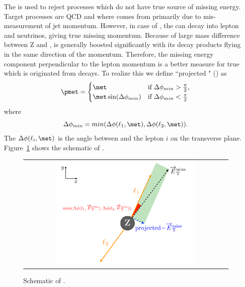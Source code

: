 The \met{} is used to reject processes which do not have true source of missing energy. 
Target processes are QCD and \dyll{} where \met{} comes from primarily due to 
mis-measurement of jet momentum. However, in case of \dytt{}, the \Tau{} can 
decay into lepton and neutrinos, giving true missing momentum. Because of large 
mass difference between Z and \Tau{}, \Tau{} is generally boosted significantly 
with its decay products flying in the same direction of the \Tau momentum. 
Therefore, the missing energy component perpendicular to the lepton momentum 
is a better measure for true \met{} which is originated from \Tau{} decays. 
To realize this we define ``projected \met " (\pmet) as 
\begin{equation}
\pmet 
= 
\begin{cases} \met & \text{if $\Delta\phi_{min}>\frac{\pi}{2}$,}
\\
\met\sin(\Delta\phi_{min}) & \text{if $\Delta\phi_{min}<\frac{\pi}{2}$}
\end{cases}
\end{equation}
where  
\begin{equation}
\Delta\phi_{min} =  min(\Delta\phi(\ell_1,\met),\Delta\phi(\ell_2,\met)).
\end{equation}
The $\Delta\phi(\ell_i,\met)$ is the angle between \met{} and the lepton $i$ 
on the transverse plane. Figure~\ref{fig:projmetscheme} shows the schematic 
of \pmet. 
\begin{figure}[htp] 
\centering 
\begin{tabular}{c} 
\includegraphics[width=0.7\textwidth]{figures/projmet.pdf} 
\end{tabular} 
\caption{Schematic of \pmet.}
\label{fig:projmetscheme} 
\end{figure}  
%
